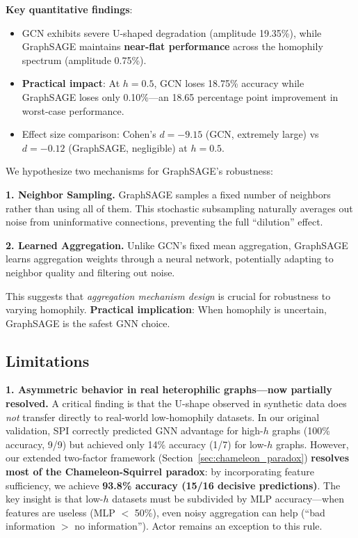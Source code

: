 \textbf{Key quantitative findings}:
\begin{itemize}
    \item GCN exhibits severe U-shaped degradation (amplitude 19.35\%), while GraphSAGE maintains \textbf{near-flat performance} across the homophily spectrum (amplitude 0.75\%).
    \item \textbf{Practical impact}: At $h=0.5$, GCN loses 18.75\% accuracy while GraphSAGE loses only 0.10\%---an 18.65 percentage point improvement in worst-case performance.
    \item Effect size comparison: Cohen's $d=-9.15$ (GCN, extremely large) vs $d=-0.12$ (GraphSAGE, negligible) at $h=0.5$.
\end{itemize}

We hypothesize two mechanisms for GraphSAGE's robustness:

\textbf{1. Neighbor Sampling.} GraphSAGE samples a fixed number of neighbors rather than using all of them. This stochastic subsampling naturally averages out noise from uninformative connections, preventing the full ``dilution'' effect.

\textbf{2. Learned Aggregation.} Unlike GCN's fixed mean aggregation, GraphSAGE learns aggregation weights through a neural network, potentially adapting to neighbor quality and filtering out noise.

This suggests that \textit{aggregation mechanism design} is crucial for robustness to varying homophily. \textbf{Practical implication}: When homophily is uncertain, GraphSAGE is the safest GNN choice.

\subsection{Limitations}

\textbf{1. Asymmetric behavior in real heterophilic graphs---now partially resolved.} A critical finding is that the U-shape observed in synthetic data does \textit{not} transfer directly to real-world low-homophily datasets. In our original validation, SPI correctly predicted GNN advantage for high-$h$ graphs (100\% accuracy, 9/9) but achieved only 14\% accuracy (1/7) for low-$h$ graphs. However, our extended two-factor framework (Section~\ref{sec:chameleon_paradox}) \textbf{resolves most of the Chameleon-Squirrel paradox}: by incorporating feature sufficiency, we achieve \textbf{93.8\% accuracy (15/16 decisive predictions)}. The key insight is that low-$h$ datasets must be subdivided by MLP accuracy---when features are useless (MLP $<$ 50\%), even noisy aggregation can help (``bad information $>$ no information''). Actor remains an exception to this rule.

